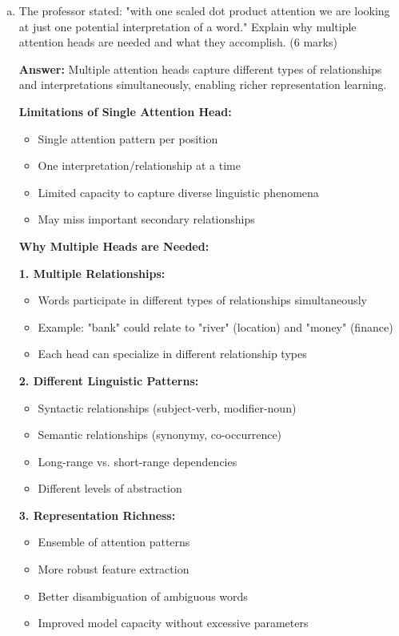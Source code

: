 \documentclass[12pt]{article}
\newcommand{\answer}[1]{{\color{answercolor}\textbf{Answer:} #1}}
\newcommand{\explanation}[1]{{\color{explanationcolor}#1}}
\begin{document}
\begin{enumerate}[(a)]
    \item The professor stated: "with one scaled dot product attention we are looking at just one potential interpretation of a word." Explain why multiple attention heads are needed and what they accomplish. \hfill (6 marks)
    
    \answer{Multiple attention heads capture different types of relationships and interpretations simultaneously, enabling richer representation learning.}
    
    \explanation{
    \textbf{Limitations of Single Attention Head:}
    \begin{itemize}
        \item Single attention pattern per position
        \item One interpretation/relationship at a time
        \item Limited capacity to capture diverse linguistic phenomena
        \item May miss important secondary relationships
    \end{itemize}
    
    \textbf{Why Multiple Heads are Needed:}
    
    \textbf{1. Multiple Relationships:}
    \begin{itemize}
        \item Words participate in different types of relationships simultaneously
        \item Example: "bank" could relate to "river" (location) and "money" (finance)
        \item Each head can specialize in different relationship types
    \end{itemize}
    
    \textbf{2. Different Linguistic Patterns:}
    \begin{itemize}
        \item Syntactic relationships (subject-verb, modifier-noun)
        \item Semantic relationships (synonymy, co-occurrence)
        \item Long-range vs. short-range dependencies
        \item Different levels of abstraction
    \end{itemize}
    
    \textbf{3. Representation Richness:}
    \begin{itemize}
        \item Ensemble of attention patterns
        \item More robust feature extraction
        \item Better disambiguation of ambiguous words
        \item Improved model capacity without excessive parameters
    \end{itemize}
    
}
\end{enumerate}
\end{document}
